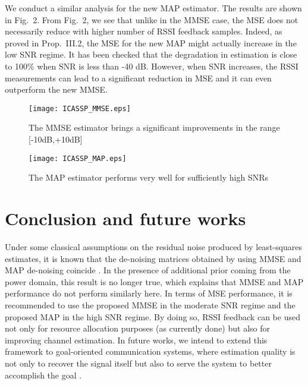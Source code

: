 \documentclass[francais]{gretsi}
\begin{document}
 We conduct a similar analysis for the new MAP estimator. The results are shown in Fig.~2. From Fig.~2, we see that unlike in the MMSE case, the MSE does not necessarily reduce with higher number of RSSI feedback samples. Indeed, as proved in Prop.~III.2, the MSE for the new MAP might actually increase in the low SNR regime. It has been checked that the degradation in estimation is close to 100\% when SNR is less than -40 dB. However, when SNR increases, the RSSI measurements can lead to a significant reduction in MSE and it can even outperform the new MMSE. 

 \begin{figure}[!h]
   \begin{center}
        \texttt{[image: ICASSP\_MMSE.eps]}
    \end{center}
  \caption{The MMSE estimator brings a significant improvements in the range [-10dB,+10dB]}
   \label{fig:MMSE}
\end{figure}
\begin{figure}[!h]
   \begin{center}
        \texttt{[image: ICASSP\_MAP.eps]}
    \end{center}
  \caption{The MAP estimator performs very well for sufficiently high SNRs}
   \label{fig:MAP}
\end{figure}




\section{Conclusion and future works}

Under some classical assumptions on the residual noise produced by least-squares estimates, it is known that the de-noising matrices obtained by using MMSE and MAP de-noising coincide \cite{lasaulce-vtc-2001}. In the presence of additional prior coming from the power domain, this result is no longer true, which explains that MMSE and MAP performance do not perform similarly here. In terms of MSE performance, it is recommended to use the proposed MMSE in the moderate SNR regime and the proposed MAP in the high SNR regime. By doing so, RSSI feedback can be used not only for resource allocation purposes (as currently done) but also for improving channel estimation. In future works, we intend to extend this framework to goal-oriented communication systems, where estimation quality is not only to recover the signal itself but also to serve the system to better accomplish the goal \cite{Zhang-AE-2021}\cite{Zhang-JSAC-2022}\cite{Zhang-IoTM-2022}.
\end{document}
